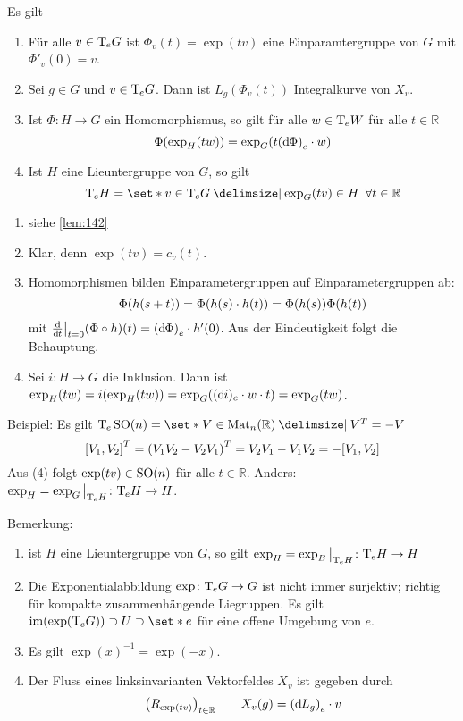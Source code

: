 \begin{lemma}[label=lem:143]
	Es gilt
	\begin{enumerate}[(1),itemsep=0pt]
		\item Für alle $v \in \Tmap_eG$ ist $\Phi_v(t)=\exp(tv)$ eine Einparamtergruppe von $G$ mit $\Phi'_v(0)=v$.
		\item Sei $g \in G$ und $v \in \Tmap_eG$.
		Dann ist $L_g(\Phi_v(t))$ Integralkurve von $X_v$.
		\item Ist $\Phi \colon H \to G$ ein Homomorphismus, so gilt für alle $w \in \Tmap_eW$ für alle $t \in \mathbb{R}$
		\[
			\Phi \enbrace*{\exp_H(tw)} = \exp_G \enbrace*{t \enbrace*{\mathd \Phi}_e \cdot w}
		\]
		\item Ist $H$ eine Lieuntergruppe von $G$, so gilt
		\[
			\Tmap_e H = \set*{v \in \Tmap_e G \given \exp_G(tv) \in H \enspace \forall t \in \mathbb{R}}
		\]
	\end{enumerate}
\end{lemma}
\begin{beweis}
	\begin{enumerate}[(1),itemsep=0pt]
		\item siehe \autoref{lem:142}
		\item Klar, denn $\exp(tv)=c_v(t)$.
		\item Homomorphismen bilden Einparametergruppen auf Einparametergruppen ab:
		\[
			\Phi \enbrace*{h(s+t)} = \Phi \enbrace*{h(s) \cdot h(t)} = \Phi \enbrace*{h(s)} \Phi \enbrace*{h(t)}
		\]
		mit $\diffd{}{t}\big|_{t=0} (\Phi \circ h)(t) = \enbrace*{\mathd\Phi}_e \cdot h'(0)$.
		Aus der Eindeutigkeit folgt die Behauptung.
		\item Sei $i \colon H \to G$ die Inklusion.
		Dann ist $\exp_H(tw) = i \enbrace*{\exp_H(tw)} = \exp_G \enbrace*{(\mathd i)_e \cdot w \cdot t} = \exp_G(tw)$.\qedhere
	\end{enumerate}
\end{beweis}

Beispiel: Es gilt $\Tmap_e\SO(n) = \set*{V \in \Mat_n(\mathbb{R}) \given V^T =-V}$
\[
	\benbrace*{V_1,V_2}^T = \enbrace*{V_1 V_2 - V_2 V_1}^T = V_2 V_1 - V_1 V_2 = -\benbrace*{V_1,V_2}
\]
Aus (4) folgt $\exp(tv) \in \SO(n)$ für alle $t \in \mathbb{R}$. Anders: $\exp_H = \exp_G\big|_{\Tmap_e H} \colon \Tmap_e H \to H$.

Bemerkung: 
\begin{enumerate}[1)]
	\item ist $H$ eine Lieuntergruppe von $G$, so gilt $\exp_H  = \exp_B\big|_{\Tmap_e H} \colon \Tmap_e H \to H$
	\item Die Exponentialabbildung $\exp \colon \Tmap_e G \to G$ ist nicht immer surjektiv; richtig für kompakte zusammenhängende Liegruppen.
	Es gilt $\im \enbrace*{\exp (\Tmap_e G)} \supset U \supset \set*{e}$ für eine offene Umgebung von $e$.
	\item Es gilt $\exp(x)^{-1} = \exp(-x)$.
	\item Der Fluss eines linksinvarianten Vektorfeldes $X_v$ ist gegeben durch
	\[
		\enbrace*{R_{\exp(tv)}}_{t \in \mathbb{R}} \qquad X_v(g) = \enbrace*{\mathd L_g}_e \cdot v
	\]
\end{enumerate}

